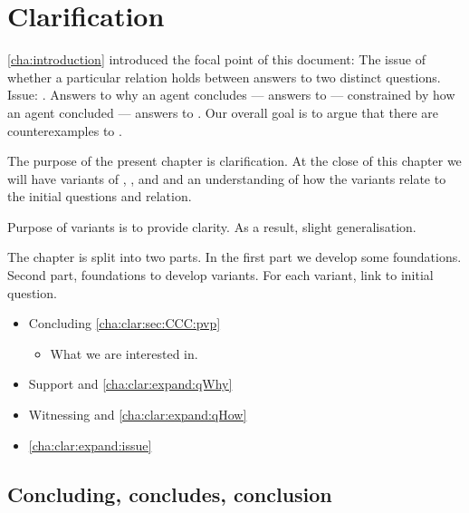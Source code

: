 \chapter{Clarification}
\label{cha:clar}

\begin{note}
  \autoref{cha:introduction} introduced the focal point of this document:
  The issue of whether a particular relation holds between answers to two distinct questions.
  Issue: \issueInclusion{}.
  Answers to why an agent concludes  --- answers to \qWhy{} --- constrained by how an agent concluded --- answers to \qHow{}.
  Our overall goal is to argue that there are counterexamples to \issueInclusion{}.

  The purpose of the present chapter is clarification.
  At the close of this chapter we will have variants of \qWhy{}, \qHow{}, and \issueInclusion{} and an understanding of how the variants relate to the initial questions and relation.

  Purpose of variants is to provide clarity.
  As a result, slight generalisation.
\end{note}

\begin{note}
  The chapter is split into two parts.
  In the first part we develop some foundations.
  Second part, foundations to develop variants.
  For each variant, link to initial question.

  \begin{itemize}
  \item
    Concluding \hfill \autoref{cha:clar:sec:CCC:pvp}
    \begin{itemize}
    \item
      What we are interested in.
    \end{itemize}
  \end{itemize}

  \begin{itemize}
  \item
    Support and \qWhy{} \hfill \autoref{cha:clar:expand:qWhy}
  \item
    Witnessing and \qHow{} \hfill \autoref{cha:clar:expand:qHow}
  \item
    \issueInclusion{} \hfill \autoref{cha:clar:expand:issue}
  \end{itemize}
\end{note}

\section{Concluding, concludes, conclusion}
\label{cha:clar:sec:CCC}

